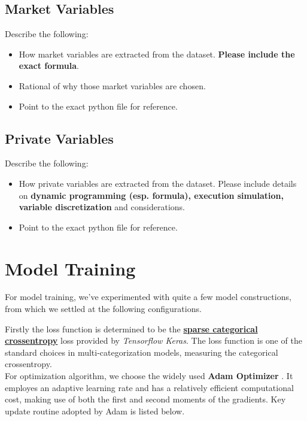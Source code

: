 \documentclass[12pt]{extarticle}
\begin{document}
\subsection{Market Variables} \label{market-variables}

Describe the following:
\begin{itemize}
  \item How market variables are extracted from the dataset. \textbf{Please include the exact formula}.
  \item Rational of why those market variables are chosen.
  \item Point to the exact python file for reference.
\end{itemize}

\subsection{Private Variables} \label{private-variables}

Describe the following:
\begin{itemize}
  \item How private variables are extracted from the dataset. Please include details on
  \textbf{dynamic programming (esp. formula), execution simulation, variable discretization} and considerations.
  \item Point to the exact python file for reference.
\end{itemize}

\section{Model Training}
For model training, we've experimented with quite a few model constructions, from which
we settled at the following configurations.

Firstly the loss function is determined to be the
\href{https://github.com/tensorflow/tensorflow/blob/r1.13/tensorflow/python/keras/backend.py}{\textbf{sparse categorical crossentropy}}
loss provided by \textit{Tensorflow Keras}. The loss function is one of the standard
choices in multi-categorization models, measuring the categorical crossentropy. \\


\noindent For optimization algorithm, we choose the widely used \textbf{Adam Optimizer} \cite{adam}.
It employes an adaptive learning rate and has a relatively efficient computational cost,
making use of both the first and second moments of the gradients. Key update routine
adopted by Adam is listed below.
\end{document}
